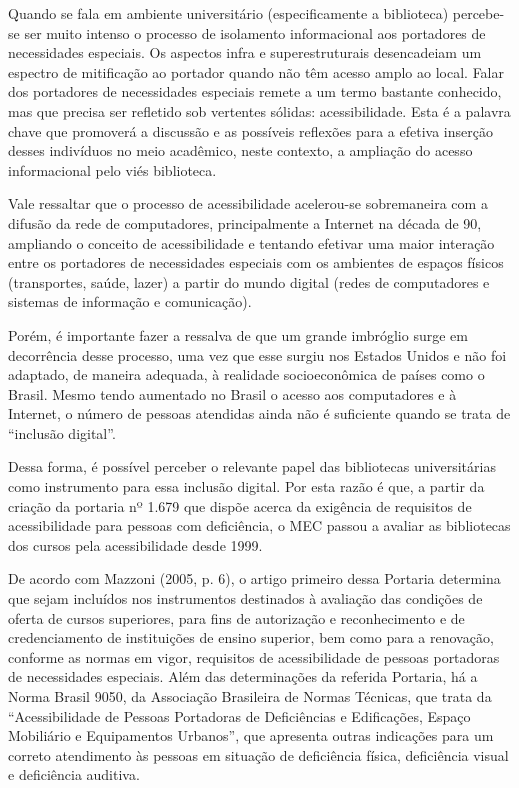 	Quando se fala em ambiente universitário (especificamente a biblioteca) percebe-se ser muito intenso o processo de isolamento informacional aos portadores de necessidades especiais. Os aspectos infra e superestruturais desencadeiam um espectro de mitificação ao portador quando não têm acesso amplo ao local.
Falar dos portadores de necessidades especiais remete a um termo bastante conhecido, mas que precisa ser refletido sob vertentes sólidas: acessibilidade. Esta é a palavra chave que promoverá a discussão e as possíveis reflexões para a efetiva inserção desses indivíduos no meio acadêmico, neste contexto, a ampliação do acesso informacional pelo viés biblioteca.


	Vale ressaltar que o processo de acessibilidade acelerou-se sobremaneira com a difusão da rede de computadores, principalmente a Internet na década de 90, ampliando o conceito de acessibilidade e tentando efetivar uma maior interação entre os portadores de necessidades especiais com os ambientes de espaços físicos (transportes, saúde, lazer) a partir do mundo digital (redes de computadores e sistemas de informação e comunicação).

	Porém, é importante fazer a ressalva de que um grande imbróglio surge em decorrência desse processo, uma vez que esse surgiu nos Estados Unidos e não foi adaptado, de maneira adequada, à realidade socioeconômica de países como o Brasil. Mesmo tendo aumentado no Brasil o acesso aos computadores e à Internet, o número de pessoas atendidas ainda não é suficiente quando se trata de ``inclusão digital''.

	Dessa forma, é possível perceber o relevante papel das bibliotecas universitárias como instrumento para essa inclusão digital. Por esta razão é que, a partir da criação da portaria nº 1.679 que dispõe acerca da exigência de requisitos de acessibilidade para pessoas com deficiência, o MEC passou a avaliar as bibliotecas dos cursos pela acessibilidade desde 1999.

	De acordo com Mazzoni (2005, p. 6), o artigo primeiro dessa Portaria determina que sejam incluídos nos instrumentos destinados à avaliação das condições de oferta de cursos superiores, para fins de autorização e reconhecimento e de credenciamento de instituições de ensino superior, bem como para a renovação, conforme as normas em vigor, requisitos de acessibilidade de pessoas portadoras de necessidades especiais. Além das determinações da referida Portaria, há a Norma Brasil 9050, da Associação Brasileira de Normas Técnicas, que trata da “Acessibilidade de Pessoas Portadoras de Deficiências e Edificações, Espaço Mobiliário e Equipamentos Urbanos”, que apresenta outras indicações para um correto atendimento às pessoas em situação de deficiência física, deficiência visual e deficiência auditiva.

